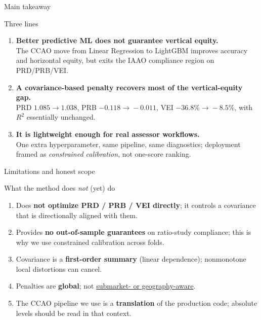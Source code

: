 \documentclass[aspectratio=169,12pt,]{beamer}
\newcommand{\1}{\mathbf{1}}
\begin{document}
\begin{frame}{Main takeaway}

\vspace{4mm}
\begin{block}{ Three lines}
\begin{enumerate}
    \medskip
    \item \textbf{Better predictive ML does not guarantee vertical equity.}\\[1mm]
    {\scriptsize The CCAO move from Linear Regression to LightGBM improves accuracy and horizontal equity, but exits the IAAO compliance region on PRD/PRB/VEI.}
    \medskip
    \item \textbf{A covariance-based penalty recovers most of the vertical-equity gap.}\\[1mm]
    {\scriptsize PRD $1.085\!\to\!1.038$, PRB $-0.118\!\to\!-0.011$, VEI $-36.8\%\!\to\!-8.5\%$, with $R^2$ essentially unchanged.}
    \medskip
    \item \textbf{It is lightweight enough for real assessor workflows.}\\[1mm]
    {\scriptsize One extra hyperparameter, same pipeline, same diagnostics; deployment framed as \emph{constrained calibration}, not one-score ranking.}
    \medskip
\end{enumerate}
\end{block}

\end{frame}


\begin{frame}{Limitations and honest scope}

\begin{block}{What the method does \emph{not} (yet) do}
\begin{enumerate}
    \medskip
    \item Does \textbf{not optimize PRD / PRB / VEI directly}; it controls a covariance that is directionally aligned with them.
    \medskip
    \item Provides \textbf{no out-of-sample guarantees} on ratio-study compliance; this is why we use constrained calibration across folds.
    \medskip
    \item Covariance is a \textbf{first-order summary} (linear dependence); nonmonotone local distortions can cancel.
    \medskip
    \item Penalties are \textbf{global}; not \underline{submarket- or geography-aware}.
    \medskip
    \item The CCAO pipeline we use is a \textbf{translation} of the production code; absolute levels should be read in that context.
    \medskip
\end{enumerate}
\end{block}

\end{frame}
\end{document}
